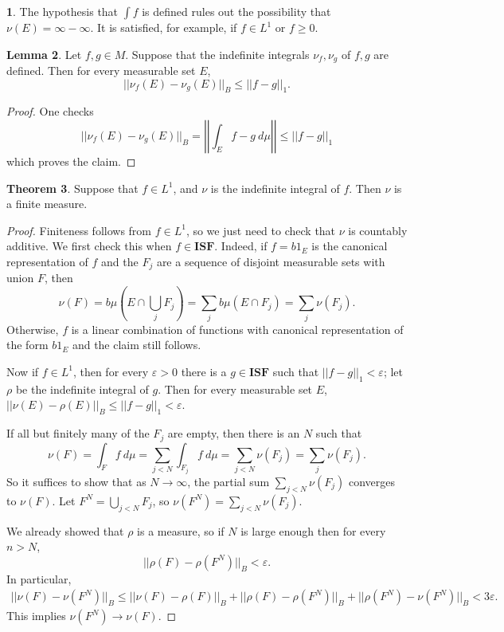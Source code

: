 \documentclass[12pt]{book}
\newcommand{\ISF}{\mathbf{ISF}}
\theoremstyle{definition}
\newtheorem{theorem}{Theorem}[section]
\newtheorem{lemma}[theorem]{Lemma}
\newtheorem{subsec}[theorem]{}
\begin{document}
\begin{subsec}
The hypothesis that $\int f$ is defined rules out the possibility that $\nu(E) = \infty - \infty$.
It is satisfied, for example, if $f \in L^1$ or $f \geq 0$.
\end{subsec}

\begin{lemma}
Let $f,g \in M$. Suppose that the indefinite integrals $\nu_f,\nu_g$ of $f,g$ are defined. Then for every measurable set $E$,
$$||\nu_f(E) - \nu_g(E)||_B \leq ||f - g||_1.$$
\end{lemma}
\begin{proof}
One checks
$$||\nu_f(E) - \nu_g(E)||_B = \left|\left| \int_E f - g ~d\mu\right|\right| \leq ||f - g||_1$$
which proves the claim.
\end{proof}

\begin{theorem}
Suppose that $f \in L^1$, and $\nu$ is the indefinite integral of $f$. Then $\nu$ is a finite measure.
\end{theorem}
\begin{proof}
Finiteness follows from $f \in L^1$, so we just need to check that $\nu$ is countably additive.
We first check this when $f \in \ISF$. Indeed, if $f = b1_E$ is the canonical representation of $f$ and the $F_j$ are a sequence of disjoint measurable sets with union $F$, then
$$\nu(F) = b\mu\left(E \cap \bigcup_j F_j\right) = \sum_j b\mu(E \cap F_j) = \sum_j \nu(F_j).$$
Otherwise, $f$ is a linear combination of functions with canonical representation of the form $b1_E$ and the claim still follows.

Now if $f \in L^1$, then for every $\varepsilon > 0$ there is a $g \in \ISF$ such that $||f - g||_1 < \varepsilon$; let $\rho$ be the indefinite integral of $g$. Then for every measurable set $E$, $||\nu(E) - \rho(E)||_B \leq ||f - g||_1 < \varepsilon$.

If all but finitely many of the $F_j$ are empty, then there is an $N$ such that
$$\nu(F) = \int_F f ~d\mu = \sum_{j<N} \int_{F_j} f~d\mu = \sum_{j<N} \nu(F_j) = \sum_j \nu(F_j).$$
So it suffices to show that as $N \to \infty$, the partial sum $\sum_{j<N} \nu(F_j)$ converges to $\nu(F)$.
Let $F^N = \bigcup_{j<N} F_j$, so $\nu(F^N) = \sum_{j<N} \nu(F_j)$.

We already showed that $\rho$ is a measure, so if $N$ is large enough then for every $n > N$,
$$||\rho(F) - \rho(F^N)||_B < \varepsilon.$$
In particular,
\begin{align*}
||\nu(F) - \nu(F^N)||_B \leq ||\nu(F) - \rho(F)||_B + ||\rho(F) - \rho(F^N)||_B + ||\rho(F^N) - \nu(F^N)||_B < 3\varepsilon.
\end{align*}
This implies $\nu(F^N) \to \nu(F)$.
\end{proof}
\end{document}

